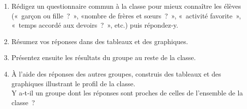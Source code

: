 
\begin{TP}[Enquête]


\begin{enumerate}
 \item Rédigez un questionnaire commun à la classe pour mieux connaître les élèves (« garçon ou fille ? », «nombre de frères et sœurs ? », « activité favorite », « temps accordé aux devoirs ? », etc.) puis répondez‑y.
 \item Résumez vos réponses dans des tableaux et des graphiques.
 \item Présentez ensuite les résultats du groupe au reste de la classe.
 \end{enumerate}
 

\begin{enumerate}
\setcounter{enumi}{3}
 \item À l'aide des réponses des autres groupes, construis des tableaux et des graphiques illustrant le profil de la classe. \\[1em]
Y a‑t‑il un groupe dont les réponses sont proches de celles de l'ensemble de la classe ?
 \end{enumerate}
 
 
\vfill
 
\end{TP}

